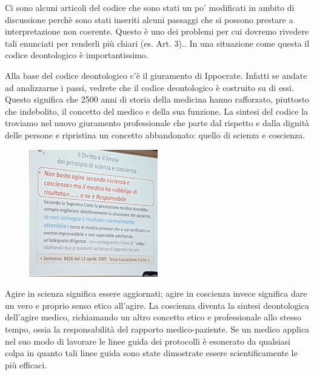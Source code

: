 Ci sono alcuni articoli del codice che sono stati un po' modificati in
ambito di discussione perchè sono stati inseriti alcuni passaggi che si
possono prestare a interpretazione non coerente. Questo è uno dei
problemi per cui dovremo rivedere tali enunciati per renderli più chiari
(es. Art. 3).. In una situazione come questa il codice deontologico è
importantissimo.

Alla base del codice deontologico c'è il giuramento di Ippocrate.
Infatti se andate ad analizzarne i passi, vedrete che il codice
deontologico è costruito su di essi. Questo significa che 2500 anni di
storia della medicina hanno rafforzato, piuttosto che indebolito, il
concetto del medico e della sua funzione. La sintesi del codice la
troviamo nel nuovo giuramento professionale che parte dal rispetto e
dalla dignità delle persone e ripristina un concetto abbandonato: quello
di scienza e coscienza.

\begin{figure}[!ht]
\centering
	\includegraphics[width=0.5\textwidth]{29/image1.jpeg}
	\end{figure}

Agire in scienza significa essere aggiornati; agire in coscienza invece
significa dare un vero e proprio senso etico all'agire. La coscienza
diventa la sintesi deontologica dell'agire medico, richiamando un altro
concetto etico e professionale allo stesso tempo, ossia la
responsabilità del rapporto medico-paziente. Se un medico applica nel
suo modo di lavorare le linee guida dei protocolli è esonerato da
qualsiasi colpa in quanto tali linee guida sono state dimostrate essere
scientificamente le più efficaci.

